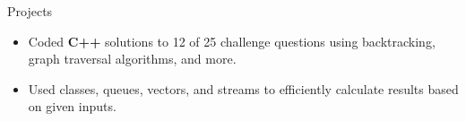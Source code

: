 \documentclass{resume} %
\begin{document}
\begin{workSection}{Projects}
	\customItem[
	title=\href{https://github.com/AshkanArabim/advent-of-code-2022}{Advent of Code 2022 - Annual Programming Challenge \faExternalLink},
	duration=August 2023,
	]
	\begin{itemize}
		\vspace{-0.5em}
		\itemsep -6pt {}
		\item Coded \textbf{C++} solutions to 12 of 25 challenge questions using backtracking, graph traversal algorithms, and more.
		\item Used classes, queues, vectors, and streams to efficiently calculate results based on given inputs.
	\end{itemize}




\end{workSection}
\end{document}

